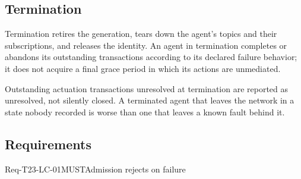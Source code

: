 \hypertarget{termination}{%
\subsection{Termination}\label{termination}}

Termination retires the generation, tears down the agent's topics and
their subscriptions, and releases the identity. An agent in termination
completes or abandons its outstanding transactions according to its
declared failure behavior; it does not acquire a final grace period in
which its actions are unmediated.

Outstanding actuation transactions unresolved at termination are
reported as unresolved, not silently closed. A terminated agent that
leaves the network in a state nobody recorded is worse than one that
leaves a known fault behind it.

\hypertarget{requirements-6}{%
\subsection{Requirements}\label{requirements-6}}

\begin{requirement}{Req-T23-LC-01}{MUST}{Admission rejects on failure}
\end{requirement}

